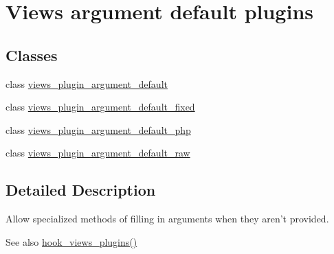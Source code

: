 \hypertarget{group__views__argument__default__plugins}{
\section{Views argument default plugins}
\label{group__views__argument__default__plugins}
}
\subsection*{Classes}
\begin{DoxyCompactItemize}
\item 
class \hyperlink{classviews__plugin__argument__default}{views\_\-plugin\_\-argument\_\-default}
\item 
class \hyperlink{classviews__plugin__argument__default__fixed}{views\_\-plugin\_\-argument\_\-default\_\-fixed}
\item 
class \hyperlink{classviews__plugin__argument__default__php}{views\_\-plugin\_\-argument\_\-default\_\-php}
\item 
class \hyperlink{classviews__plugin__argument__default__raw}{views\_\-plugin\_\-argument\_\-default\_\-raw}
\end{DoxyCompactItemize}


\subsection{Detailed Description}
Allow specialized methods of filling in arguments when they aren't provided.

\begin{DoxySeeAlso}{See also}
\hyperlink{group__views__hooks_ga23f6e9972b2ed84fc54b7ff63f44477d}{hook\_\-views\_\-plugins()} 
\end{DoxySeeAlso}
